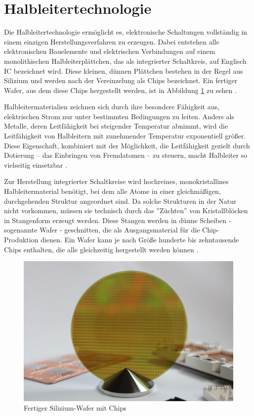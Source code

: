\section{Halbleitertechnologie}

Die Halbleitertechnologie ermöglicht es, elektronische Schaltungen vollständig in einem einzigen Herstellungsverfahren zu erzeugen. Dabei entstehen alle elektronischen Bauelemente und elektrischen Verbindungen auf einem monolithischen Halbleiterplättchen, das als integrierter Schaltkreis, auf Englisch \gls{IC} bezeichnet wird. Diese kleinen, dünnen Plättchen bestehen in der Regel aus Silizium und werden nach der Vereinzelung als Chips bezeichnet. Ein fertiger Wafer, aus dem diese Chips hergestellt werden, ist in Abbildung \ref{fig:Silizium-Wafer} zu sehen \cite{lienig2023halbleitertechnologie}.

Halbleitermaterialien zeichnen sich durch ihre besondere Fähigkeit aus, elektrischen Strom nur unter bestimmten Bedingungen zu leiten. Anders als Metalle, deren Leitfähigkeit bei steigender Temperatur abnimmt, wird die Leitfähigkeit von Halbleitern mit zunehmender Temperatur exponentiell größer. Diese Eigenschaft, kombiniert mit der Möglichkeit, die Leitfähigkeit gezielt durch Dotierung – das Einbringen von Fremd\-atomen – zu steuern, macht Halbleiter so vielseitig einsetzbar \cite{lienig2023halbleitertechnologie}.

Zur Herstellung integrierter Schaltkreise wird hochreines, monokristallines Halbleitermaterial benötigt, bei dem alle Atome in einer gleichmäßigen, durchgehenden Struktur angeordnet sind. Da solche Strukturen in der Natur nicht vorkommen, müssen sie technisch durch das ''Züchten'' von Kristallblöcken in Stangenform erzeugt werden. Diese Stangen werden in dünne Scheiben - sogenannte Wafer - geschnitten, die als Ausgangsmaterial für die Chip-Produktion dienen. Ein Wafer kann je nach Größe hunderte bis zehntausende Chips enthalten, die alle gleichzeitig hergestellt werden können \cite{lienig2023halbleitertechnologie}.

\begin{figure}[!h]
    \centering
    \includegraphics[width=1\textwidth]{bilder/SiC-Wafer-Infineon.jpg}
    \caption{Fertiger Silizium-Wafer mit Chips \cite{infineon2024dünnsterWafer}}
    \label{fig:Silizium-Wafer}
\end{figure}

